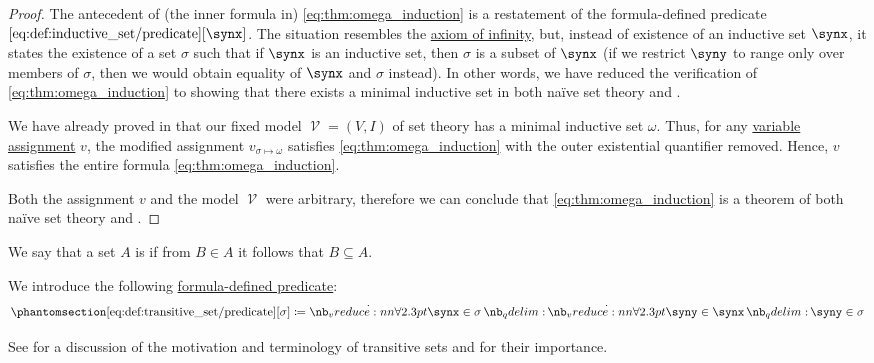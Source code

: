 \begin{proof}
  The antecedent of (the inner formula in) \eqref{eq:thm:omega_induction} is a restatement of the formula-defined predicate \( \ref{eq:def:inductive_set/predicate}[\synx] \). The situation resembles the \hyperref[eq:def:zfc/infinity]{axiom of infinity}, but, instead of existence of an inductive set \( \synx \), it states the existence of a set \( \sigma \) such that if \( \synx \) is an inductive set, then \( \sigma \) is a subset of \( \synx \) (if we restrict \( \syny \) to range only over members of \( \sigma \), then we would obtain equality of \( \synx \) and \( \sigma \) instead). In other words, we have reduced the verification of \eqref{eq:thm:omega_induction} to showing that there exists a minimal inductive set in both na\"ive set theory and .

  We have already proved in  that our fixed model \( \mscrV = (V, I) \) of set theory has a minimal inductive set \( \omega \). Thus, for any \hyperref[def:first_order_valuation/variable_assignment]{variable assignment} \( v \), the modified assignment \( v_{\sigma \mapsto \omega} \) satisfies \eqref{eq:thm:omega_induction} with the outer existential quantifier removed. Hence, \( v \) satisfies the entire formula \eqref{eq:thm:omega_induction}.

  Both the assignment \( v \) and the model \( \mscrV \) were arbitrary, therefore we can conclude that \eqref{eq:thm:omega_induction} is a theorem of both na\"ive set theory and .
\end{proof}

\begin{definition}\label{def:transitive_set}
  We say that a set \( A \) is  if from \( B \in A \) it follows that \( B \subseteq A \).

  We introduce the following \hyperref[con:formula_defined_predicate]{formula-defined predicate}:
  \begin{equation*}\taglabel[\op{IsSetTransitive}]{eq:def:transitive_set/predicate}
    \ref{eq:def:transitive_set/predicate}[\sigma] \coloneqq \qforall {\synx \in \sigma} \qforall {\syny \in \synx} {\syny \in \sigma}
  \end{equation*}
\end{definition}
\begin{comments}
  \item See  for a discussion of the motivation and terminology of transitive sets and  for their importance.
\end{comments}

